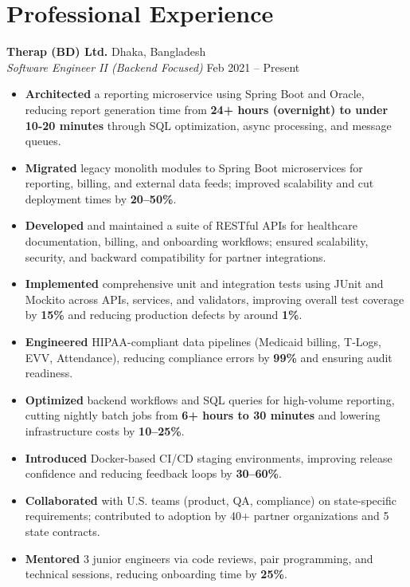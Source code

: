 \documentclass[10pt,a4paper]{article}
\begin{document}
\section*{Professional Experience}

\textbf{Therap (BD) Ltd.} \hfill Dhaka, Bangladesh \\
\textit{Software Engineer II (Backend Focused)} \hfill Feb 2021 -- Present
\begin{itemize}
    \item \textbf{Architected} a reporting microservice using Spring Boot and Oracle, reducing report generation time from \textbf{24+ hours (overnight) to under 10-20 minutes} through SQL optimization, async processing, and message queues.
    \item \textbf{Migrated} legacy monolith modules to Spring Boot microservices for reporting, billing, and external data feeds; improved scalability and cut deployment times by \textbf{20–50\%}.
    \item \textbf{Developed} and maintained a suite of RESTful APIs for healthcare documentation, billing, and onboarding workflows; ensured scalability, security, and backward compatibility for partner integrations.
    \item \textbf{Implemented} comprehensive unit and integration tests using JUnit and Mockito across APIs, services, and validators, improving overall test coverage by \textbf{15\%} and reducing production defects by around \textbf{1\%}.
    \item \textbf{Engineered} HIPAA-compliant data pipelines (Medicaid billing, T-Logs, EVV, Attendance), reducing compliance errors by \textbf{99\%} and ensuring audit readiness.
    \item \textbf{Optimized} backend workflows and SQL queries for high-volume reporting, cutting nightly batch jobs from \textbf{6+ hours to 30 minutes} and lowering infrastructure costs by \textbf{10–25\%}.
    \item \textbf{Introduced} Docker-based CI/CD staging environments, improving release confidence and reducing feedback loops by \textbf{30–60\%}.
    \item \textbf{Collaborated} with U.S. teams (product, QA, compliance) on state-specific requirements; contributed to adoption by 40+ partner organizations and 5 state contracts.
    \item \textbf{Mentored} 3 junior engineers via code reviews, pair programming, and technical sessions, reducing onboarding time by \textbf{25\%}.
\end{itemize}
\end{document}
